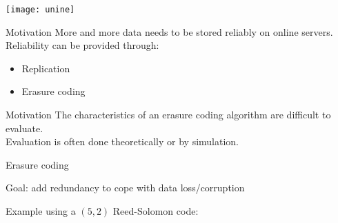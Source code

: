 {}




\begin{frame}[plain]
  
\titlepage

\begin{center}
\texttt{[image: unine]}
\end{center}

\end{frame}


\subtitle[Introduction]{Introduction}

\begin{frame}{Motivation}
    More and more data needs to be stored reliably on online servers.
    Reliability can be provided through:
    \begin{itemize}
        \item<1> Replication
        \item<1-2> Erasure coding
    \end{itemize}
\end{frame}

\begin{frame}{Motivation}
    The characteristics of an erasure coding algorithm are difficult to evaluate.\\
    Evaluation is often done theoretically or by simulation.
\end{frame}

\begin{frame}{Erasure coding}
    \begin{snugshade}
        Goal: add redundancy to cope with data loss/corruption
    \end{snugshade}

    Example using a $\left(5,2\right)$ Reed-Solomon code:
    \begin{figure}
    
    \end{figure}
\end{frame}

\subtitle{Description}


